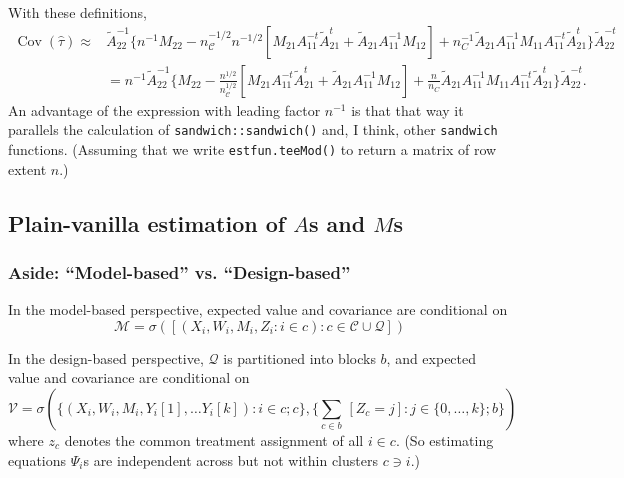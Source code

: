 \documentclass{article}
\begin{document}
With these definitions,
\begin{align}
  \operatorname{Cov}(\hat\tau) \approx& \tilde{A}_{22}^{-1}\{n^{-1} M_{22} -
                                 n_{\mathcal{C}}^{-1/2}n^{-1/2}[M_{21}A_{11}^{-t}\tilde{A}_{21}^t
                                 + \tilde{A}_{21}A_{11}^{-1}M_{12}] +
                                 n_C^{-1}\tilde{A}_{21}A_{11}^{-1}M_{11}A_{11}^{-t}\tilde{A}_{21}^{t}\}\tilde{A}_{22}^{-t}\nonumber
  \\
                               &= n^{-1}\tilde{A}_{22}^{-1}\{
                                 M_{22} -
                                 \frac{n^{1/2}}{n_{\mathcal{C}}^{1/2}}[M_{21}A_{11}^{-t}\tilde{A}_{21}^t
                                 + \tilde{A}_{21}A_{11}^{-1}M_{12}] +
                                 \frac{n}{n_C}\tilde{A}_{21}A_{11}^{-1}M_{11}A_{11}^{-t}\tilde{A}_{21}^{t}\}\tilde{A}_{22}^{-t}
                                . \label{eq:6}
\end{align}
An advantage of the expression with leading factor $n^{-1}$ is that
that way it parallels the calculation of
\texttt{sandwich::sandwich()} and, I think, other \texttt{sandwich}
functions. (Assuming that we write
\texttt{estfun.teeMod()}  to return a matrix of row extent
$n$.)

  \subsection{Plain-vanilla estimation of $A$s and $M$s}
\subsubsection {Aside: ``Model-based'' vs. ``Design-based''}\label{sec:des-vs-mod-based}

In the model-based perspective, expected value and covariance are
conditional on
\[ \mathcal{M} = \sigma\left(\left[(X_{i}, W_{i}, M_{i}, Z_{i}: i \in c): c \in
      \mathcal{C}\cup \mathcal{Q} \right]\right)\]


In the design-based perspective, $\mathcal{Q}$ is partitioned into
blocks $b$, and expected value and covariance are
conditional on
\[\mathcal{V} = \sigma(\{(X_{i}, W_{i}, M_{i}, Y_{i}[1], \ldots Y_{i}[k]):
  i \in c; c\}, \{\sum_{c
    \in b}\, \![Z_{c}=j\!] : j \in \{0, \ldots, k\}; b\} )\]
where $z_{c}$ denotes the common treatment assignment of all $i\in
c$. (So estimating equations ${\Psi}_{i}$s are independent across but not within
clusters $c \ni i$.)
\end{document}
